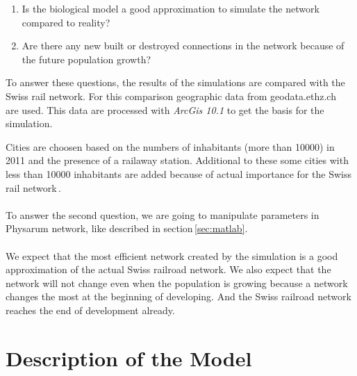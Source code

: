 \documentclass[11pt]{scrartcl}
\begin{document}
\begin{enumerate}
	\item Is the biological model a good approximation to simulate the network compared to reality?
	\item Are there any new built or destroyed connections in the network because of the future population growth?
\end{enumerate}

To answer these questions, the results of the simulations are compared with the Swiss rail network. For this comparison geographic data from geodata.ethz.ch~\cite{gis_data} are used. This data are processed with \textit{ArcGis 10.1} to get the basis for the simulation.

Cities are choosen based on the numbers of inhabitants (more than 10000) in 2011 and the presence of a railaway station. Additional to these some cities with less than 10000 inhabitants are added because of actual importance for the Swiss rail network\,\cite{bfs}. ~\\
~\\
To answer the second question, we are going to manipulate parameters in Physarum network, like described  in section\,\ref{sec:matlab}.\\
~\\
We expect that the most efficient network created by the simulation is a good approximation of the actual Swiss railroad network. We also expect that the network will not change even when the population is growing because a network changes the most at the beginning of developing. And the Swiss railroad network reaches the end of development already.




\section{Description of the Model}
\label{sec:description}
\end{document}
